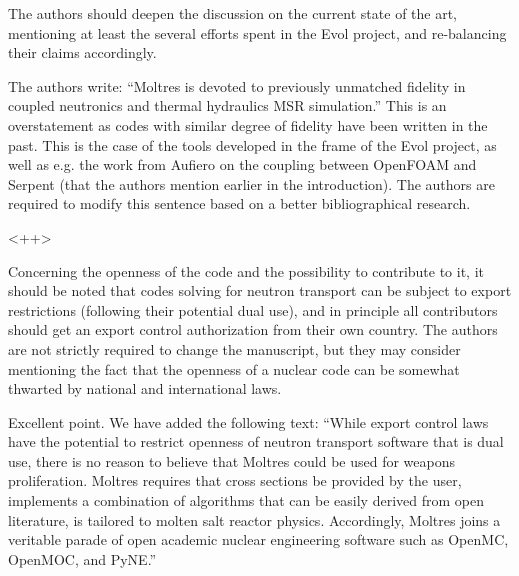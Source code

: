 \documentclass[answers,11pt]{exam}
\begin{document}
\begin{questions}
\question The authors should deepen the discussion on the current state of the art, mentioning at least the several efforts spent in the Evol project, and re-balancing their claims accordingly.

\question The authors write:
``Moltres is devoted to previously unmatched fidelity in coupled neutronics and 
        thermal hydraulics MSR simulation.''
This is an overstatement as codes with similar degree of fidelity have been written in the past. This is the case of the tools developed in the frame of the Evol project, as well as e.g. the work from Aufiero on the coupling between OpenFOAM and Serpent (that the authors mention earlier in the introduction). The authors are required to modify this sentence based on a better bibliographical research.
\begin{solution}
        <++>
\end{solution}

\question Concerning the openness of the code and the possibility to contribute to it, it should be noted that codes solving for neutron transport can be subject to export restrictions (following their potential dual use), and in principle all contributors should get an export control authorization from their own country. The authors are not strictly required to change the manuscript, but they may consider mentioning the fact that the openness of a nuclear code can be somewhat thwarted by national and international laws.
\begin{solution}
	Excellent point. We have added the following text: ``While export
control laws have the potential to restrict openness of neutron transport
software that is dual use, there is no reason to believe that Moltres could be
used for weapons proliferation.  Moltres requires that cross sections be
provided by the user, implements a combination of algorithms that can be easily
derived from open literature, is tailored to molten salt reactor physics.
Accordingly, Moltres joins a veritable parade of open academic nuclear
engineering software such as OpenMC\cite{romano_openmc:_2015},
OpenMOC\cite{boyd_openmoc_2014}, and
PyNE\cite{bates_pyne_2014,biondo_quality_2014}.'' 

\end{solution}


\end{questions}
\end{document}

